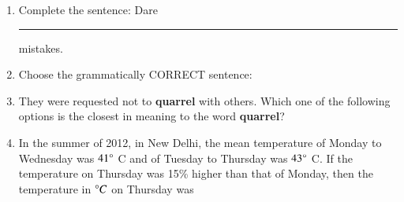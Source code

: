 \documentclass[journal,12pt,onecolumn]{IEEEtran}
\theoremstyle{remark}
\begin{document}
\begin{enumerate}
\item Complete the sentence: Dare \rule{1.5cm}{0.4pt} mistakes.  
\par \hfill{}
\begin{enumerate}
\end{enumerate}

\item Choose the grammatically CORRECT sentence:  
\par \hfill{}
\begin{enumerate}
\end{enumerate}

\item They were requested not to \textbf{quarrel} with others. Which one of the following options is the closest in meaning to the word \textbf{quarrel}?  
\par \hfill{}
\begin{enumerate}
\end{enumerate}

\item In the summer of 2012, in New Delhi, the mean temperature of Monday to Wednesday was $41 \degree$ C and of Tuesday to Thursday was $43 \degree$ C. If the temperature on Thursday was 15\% higher than that of Monday, then the temperature in $\degree C$ on Thursday was  
\par \hfill{}
\begin{enumerate}
\end{enumerate}


\end{enumerate}
\end{document}
